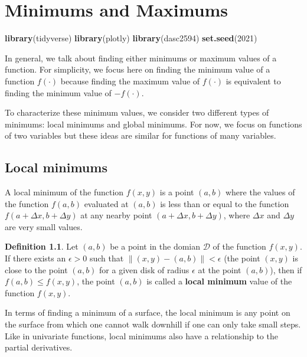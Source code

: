 \documentclass[
]{book}
\newenvironment{Shaded}{\begin{snugshade}}{\end{snugshade}}
\newcommand{\DecValTok}[1]{\textcolor[rgb]{0.00,0.00,0.81}{#1}}
\newcommand{\KeywordTok}[1]{\textcolor[rgb]{0.13,0.29,0.53}{\textbf{#1}}}
\newcommand{\NormalTok}[1]{#1}
\theoremstyle{definition}
\newtheorem{definition}{Definition}[chapter]
\theoremstyle{definition}
\theoremstyle{definition}
\theoremstyle{definition}
\theoremstyle{remark}
\begin{document}
\hypertarget{minimums-and-maximums}{%
\chapter{Minimums and Maximums}\label{minimums-and-maximums}}

\begin{Shaded}
\begin{Highlighting}[]
\KeywordTok{library}\NormalTok{(tidyverse)}
\KeywordTok{library}\NormalTok{(plotly)}
\KeywordTok{library}\NormalTok{(dasc2594)}
\KeywordTok{set.seed}\NormalTok{(}\DecValTok{2021}\NormalTok{)}
\end{Highlighting}
\end{Shaded}

In general, we talk about finding either minimums or maximum values of a function. For simplicity, we focus here on finding the minimum value of a function \(f(\cdot)\) because finding the maximum value of \(f(\cdot)\) is equivalent to finding the minimum value of \(-f(\cdot)\).

To characterize these minimum values, we consider two different types of minimums: local minimums and global minimums. For now, we focus on functions of two variables but these ideas are similar for functions of many variables.

\hypertarget{local-minimums}{%
\section{Local minimums}\label{local-minimums}}

A local minimum of the function \(f(x, y)\) is a point \((a, b)\) where the values of the function \(f(a, b)\) evaluated at \((a, b)\) is less than or equal to the function \(f(a + \Delta x, b + \Delta y)\) at any nearby point \((a + \Delta x, b + \Delta y)\), where \(\Delta x\) and \(\Delta y\) are very small values.

\begin{definition}
Let \((a, b)\) be a point in the domian \(\mathcal{D}\) of the function \(f(x, y)\). If there exists an \(\epsilon > 0\) such that \(\|(x, y) - (a, b)\| < \epsilon\) (the point \((x, y)\) is close to the point \((a, b)\) for a given disk of radius \(\epsilon\) at the point \((a, b)\)), then if \(f(a, b) \leq f(x, y)\), the point \((a, b)\) is called a \textbf{local minimum} value of the function \(f(x, y)\).
\end{definition}

In terms of finding a minimum of a surface, the local minimum is any point on the surface from which one cannot walk downhill if one can only take small steps. Like in univariate functions, local minimums also have a relationship to the partial derivatives.
\end{document}
